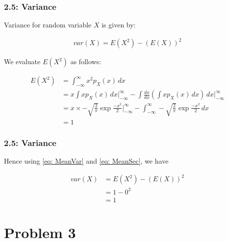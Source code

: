 \documentclass{beamer}
\begin{document}
\begin{frame}
	\frametitle{2.5: Variance}
	Variance for random variable $X$ is given by:

	\begin{align}
		var(X) = E(X^2) - (E(X))^2
		\label{eq: MeanVar}
	\end{align}

	We evaluate $E(X^2)$ as follows:

	\begin{align}
		E(X^2) &= \int^{\infty}_{-\infty} x^2 p_X(x) \,dx \\
		&= x \int x p_X(x) \,dx \Bigg|^{\infty}_{-\infty} - \int \frac{dx}{dx} (\int x p_X(x) \,dx) \,dx\Bigg|^{\infty}_{-\infty} \\
		&= x \times -\sqrt{\frac{2}{\pi}} \exp{\frac{-x^2}{2}}\Bigg|_{-\infty}^{\infty} - \int^{\infty}_{-\infty} -\sqrt{\frac{2}{\pi}} \exp{\frac{-x^2}{2}} \,dx \\
		&= 1
		\label{eq: MeanSec}
	\end{align}

\end{frame}

\begin{frame}
	\frametitle{2.5: Variance}
	Hence using \eqref{eq: MeanVar} and \eqref{eq: MeanSec}, we have

	\begin{align}
		var(X) &= E(X^2) - (E(X))^2 \\
		&= 1 - 0^2 \\
		&= 1
	\end{align}
\end{frame}

	
\section{Problem 3}
\end{document}
